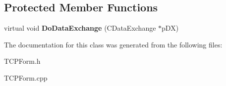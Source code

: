 \subsection*{Protected Member Functions}
\begin{DoxyCompactItemize}
\item 
\hypertarget{class_t_c_p_form_a904b920b81304813238dfe147cdb00c5}{}virtual void {\bfseries Do\+Data\+Exchange} (C\+Data\+Exchange $\ast$p\+D\+X)\label{class_t_c_p_form_a904b920b81304813238dfe147cdb00c5}

\end{DoxyCompactItemize}


The documentation for this class was generated from the following files\+:\begin{DoxyCompactItemize}
\item 
T\+C\+P\+Form.\+h\item 
T\+C\+P\+Form.\+cpp\end{DoxyCompactItemize}
